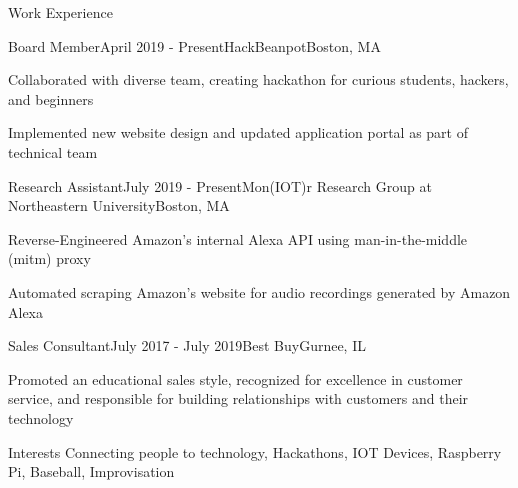 \documentclass{resume}
\begin{document}
\begin{rSection}{Work Experience}

\begin{rSubsection}{Board Member}{April 2019 - Present}{HackBeanpot}{Boston, MA}
\item Collaborated with diverse team, creating hackathon for curious students, hackers, and beginners
\item Implemented new website design and updated application portal as part of technical team
\end{rSubsection}

\begin{rSubsection}{Research Assistant}{July 2019 - Present}{Mon(IOT)r Research Group at Northeastern University}{Boston, MA}
\item Reverse-Engineered Amazon's internal Alexa API using man-in-the-middle (mitm) proxy 
\item Automated scraping Amazon's website for audio recordings generated by Amazon Alexa
\end{rSubsection}

\begin{rSubsection}{Sales Consultant}{July 2017 - July 2019}{Best Buy}{Gurnee, IL}
\item Promoted an educational sales style, recognized for excellence in customer service, and responsible for building relationships with customers and their technology
\end{rSubsection}

\end{rSection}

\begin{rSection}{Interests}\itemsep -5pt
Connecting people to technology, Hackathons, IOT Devices, Raspberry Pi, Baseball, Improvisation
\end{rSection}
\end{document}
